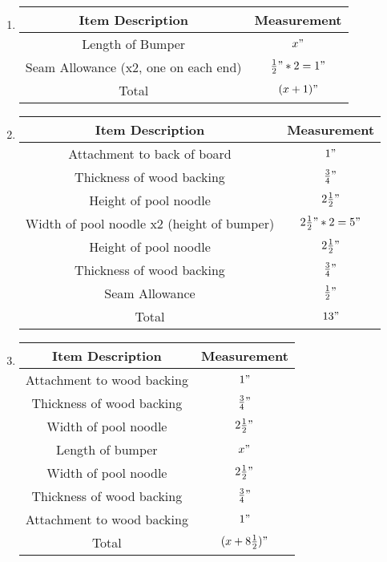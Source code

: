 \documentclass[
10pt, %
a4paper, %
oneside, %
headinclude,footinclude, %
BCOR5mm, %
]{scrartcl}
\begin{document}
\begin{enumerate}[label=\Alph*]

	\item %
	\begin{tabular}{|c|c|}
		\hline
		Item Description & Measurement \\ \hline
		Length of Bumper & $x"$ \\ \hline
		Seam Allowance (x2, one on each end) & $\frac{1}{2}" * 2 = 1"$ \\ \hline
		Total & $(x + 1)"$ \\ \hline
	\end{tabular}

	\item %
	\begin{tabular}{|c|c|}
		\hline
		Item Description & Measurement \\ \hline
		Attachment to back of board & $1"$ \\ \hline
		Thickness of wood backing & $\frac{3}{4}"$ \\ \hline
		Height of pool noodle & $2\frac{1}{2}"$ \\ \hline
		Width of pool noodle x2 (height of bumper) & $2\frac{1}{2}" * 2 = 5"$ \\ \hline
		Height of pool noodle & $2\frac{1}{2}"$ \\ \hline
		Thickness of wood backing & $\frac{3}{4}"$ \\ \hline
		Seam Allowance & $\frac{1}{2}"$ \\ \hline
		Total & $13"$ \\ \hline
	\end{tabular}
	
	\item %
	\begin{tabular}{|c|c|}
		\hline
		Item Description & Measurement \\ \hline
		Attachment to wood backing & $1"$ \\ \hline
		Thickness of wood backing & $\frac{3}{4}"$ \\ \hline
		Width of pool noodle & $2\frac{1}{2}"$ \\ \hline
		Length of bumper & $x"$ \\ \hline
		Width of pool noodle & $2\frac{1}{2}"$ \\ \hline
		Thickness of wood backing & $\frac{3}{4}"$ \\ \hline
		Attachment to wood backing & $1"$ \\ \hline
		Total & $(x + 8\frac{1}{2})"$ \\ \hline
	\end{tabular}
	

\end{enumerate}
\end{document}
